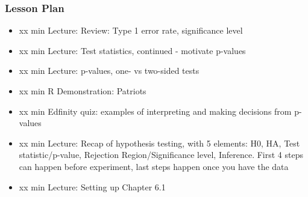 \begin{frame}
    \frametitle{Lesson Plan}
    \begin{itemize}
        \item xx min Lecture: Review: Type 1 error rate, significance level
         
        \item xx min Lecture: Test statistics, continued - motivate p-values
        \item xx min Lecture: p-values, one- vs two-sided tests
        \item xx min R Demonstration: Patriots
        \item xx min Edfinity quiz: examples of interpreting and making decisions from p-values
        \item xx min Lecture: Recap of hypothesis testing, with 5 elements: H0, HA, Test statistic/p-value, Rejection Region/Significance level, Inference. First 4 steps can happen before experiment, last steps happen once you have the data
        \item xx min Lecture: Setting up Chapter 6.1
    \end{itemize}
\end{frame}
            
